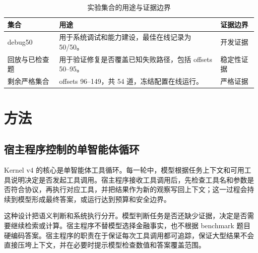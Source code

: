 \documentclass[12pt,a4paper,UTF8]{ctexart}
\begin{document}
\begin{table}[H]
\centering
\caption{实验集合的用途与证据边界}
\label{tab:splits}
\begin{tabular}{p{3.2cm}p{7.2cm}p{3.2cm}}
\toprule
集合 & 用途 & 证据边界 \\
\midrule
debug50 & 用于系统调试和能力建设，最佳在线记录为 50/50。 & 开发证据 \\
回放与已检查题 & 用于验证修复是否覆盖已知失败路径，包括 offsets 50--95。 & 稳定性证据 \\
剩余严格集合 & offsets 96--149，共 54 道，冻结配置在线运行。 & 严格证据 \\
\bottomrule
\end{tabular}
\end{table}

\section{方法}

\subsection{宿主程序控制的单智能体循环}

Kernel v4 的核心是单智能体工具循环。每一轮中，模型根据任务上下文和可用工具说明决定是否发起工具调用。宿主程序接收工具调用后，先检查工具名和参数是否符合协议，再执行对应工具，并把结果作为新的观察写回上下文；这一过程会持续到模型形成最终答案，或运行达到预算和安全边界。

这种设计把语义判断和系统执行分开。模型判断任务是否还缺少证据，决定是否需要继续检索或计算。宿主程序不替模型选择金融事实，也不根据 benchmark 题目硬编码答案。宿主程序的职责在于保证每次工具调用都可追踪，保证大型结果不会直接压垮上下文，并在必要时提示模型检查数值和答案覆盖范围。
\end{document}
